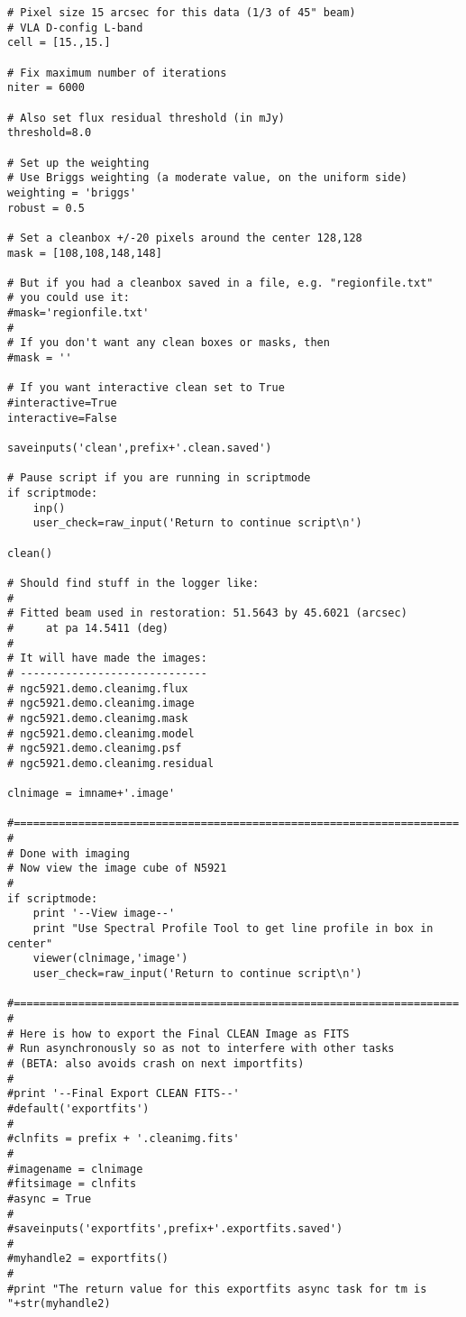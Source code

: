 \begin{verbatim}
# Pixel size 15 arcsec for this data (1/3 of 45" beam)
# VLA D-config L-band
cell = [15.,15.]

# Fix maximum number of iterations
niter = 6000

# Also set flux residual threshold (in mJy)
threshold=8.0

# Set up the weighting
# Use Briggs weighting (a moderate value, on the uniform side)
weighting = 'briggs'
robust = 0.5

# Set a cleanbox +/-20 pixels around the center 128,128
mask = [108,108,148,148]

# But if you had a cleanbox saved in a file, e.g. "regionfile.txt"
# you could use it:
#mask='regionfile.txt'
#
# If you don't want any clean boxes or masks, then
#mask = ''

# If you want interactive clean set to True
#interactive=True
interactive=False

saveinputs('clean',prefix+'.clean.saved')

# Pause script if you are running in scriptmode
if scriptmode:
    inp()
    user_check=raw_input('Return to continue script\n')

clean()

# Should find stuff in the logger like:
#
# Fitted beam used in restoration: 51.5643 by 45.6021 (arcsec)
#     at pa 14.5411 (deg)
#
# It will have made the images:
# -----------------------------
# ngc5921.demo.cleanimg.flux
# ngc5921.demo.cleanimg.image
# ngc5921.demo.cleanimg.mask
# ngc5921.demo.cleanimg.model
# ngc5921.demo.cleanimg.psf
# ngc5921.demo.cleanimg.residual

clnimage = imname+'.image'

#=====================================================================
#
# Done with imaging
# Now view the image cube of N5921
#
if scriptmode:
    print '--View image--'
    print "Use Spectral Profile Tool to get line profile in box in center"
    viewer(clnimage,'image')
    user_check=raw_input('Return to continue script\n')

#=====================================================================
#
# Here is how to export the Final CLEAN Image as FITS
# Run asynchronously so as not to interfere with other tasks
# (BETA: also avoids crash on next importfits)
#
#print '--Final Export CLEAN FITS--'
#default('exportfits')
#
#clnfits = prefix + '.cleanimg.fits'
#
#imagename = clnimage
#fitsimage = clnfits
#async = True
#
#saveinputs('exportfits',prefix+'.exportfits.saved')
#
#myhandle2 = exportfits()
#
#print "The return value for this exportfits async task for tm is "+str(myhandle2)


\end{verbatim}
